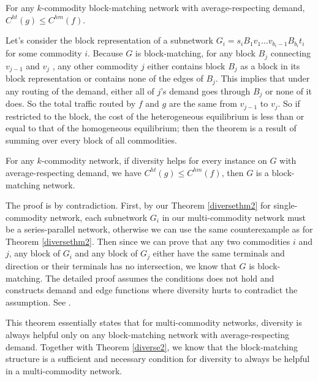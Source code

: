 \begin{theorem}
For any $k$-commodity block-matching network with average-respecting demand, $C^{ht}(g)\le C^{hm}(f)$.
\label{diverse2}
\end{theorem}

\begin{proof-sketch}

Let's consider the block representation of a subnetwork $G_i=s_i B_1 v_1\dots v_{b_i-1} B _{b_i}t_i$ for some commodity $i$. Because $G$ is block-matching, for any block $B_j$ connecting $v_{j-1}$ and $v_j$ , any other commodity $j$ either contains block $B_j$ as a block in its block representation or contains none of the edges of $B_j$. This implies that under any routing of the demand, either all of $j$'s demand goes through $B_j$ or none of it does. So the total traffic routed by $f$ and $g$ are the same from $v_{j-1}$ to $v_j$. So if restricted to the block, the cost of the heterogeneous equilibrium is less than or equal to that of the homogeneous equilibrium; then the theorem is a result of summing over every block of all commodities.

\end{proof-sketch}



\begin{theorem}
For any $k$-commodity network, if diversity helps for every instance on $G$ with average-respecting demand, we have $C^{ht}(g)\le C^{hm}(f)$, then $G$ is a block-matching network.
\end{theorem}

\begin{proof-sketch}
    The proof is by contradiction. First, by our Theorem \ref{diversethm2} for single-commodity network, each subnetwork $G_i$ in our multi-commodity network must be a series-parallel network, otherwise we can use the same counterexample as for Theorem \ref{diversethm2}. Then since we can prove  that any two commodities $i$ and $j$, any block of $G_i$ and any block of $G_j$ either have the same terminals and direction or their terminals has no intersection, we know that $G$ is block-matching. The detailed proof assumes the conditions does not hold and constructs demand and edge functions where diversity hurts to contradict the assumption. See \cite{ijcai2018-24}.
\end{proof-sketch}

This theorem essentially states that for multi-commodity networks, diversity is always helpful only on any block-matching network with average-respecting demand. Together with Theorem \ref{diverse2}, we know that the block-matching structure is a sufficient and necessary condition for diversity to always be helpful in a multi-commodity network.

